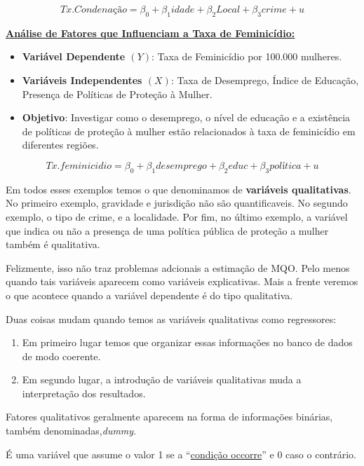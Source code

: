 \documentclass[
  letterpaper,
  DIV=11,
  numbers=noendperiod]{scrreprt}
\providecommand{\tightlist}{%
  \setlength{\itemsep}{0pt}\setlength{\parskip}{0pt}}
\begin{document}
\[Tx.Condenação = \beta_0 + \beta_1  idade  +  \beta_2 Local  + \beta_3  crime + u\]

\ul{\textbf{Análise de Fatores que Influenciam a Taxa de Feminicídio:}}

\begin{itemize}
\tightlist
\item
  \textbf{Variável Dependente \((Y)\)}: Taxa de Feminicídio por 100.000
  mulheres.
\item
  \textbf{Variáveis Independentes \((X)\)}: Taxa de Desemprego, Índice
  de Educação, Presença de Políticas de Proteção à Mulher.
\item
  \textbf{Objetivo}: Investigar como o desemprego, o nível de educação e
  a existência de políticas de proteção à mulher estão relacionados à
  taxa de feminicídio em diferentes regiões.
\end{itemize}

\[Tx.feminicidio = \beta_0 + \beta_1 desemprego + \beta_2 educ + \beta_3 política + u \]

Em todos esses exemplos temos o que denominamos de \textbf{variáveis
qualitativas}. No primeiro exemplo, gravidade e jurisdição não são
quantificaveis. No segundo exemplo, o tipo de crime, e a localidade. Por
fim, no último exemplo, a variável que indica ou não a presença de uma
política pública de proteção a mulher também é qualitativa.

Felizmente, isso não traz problemas adcionais a estimação de MQO. Pelo
menos quando tais variáveis aparecem como variáveis explicativas. Mais a
frente veremos o que acontece quando a variável dependente é do tipo
qualitativa.

Duas coisas mudam quando temos as variáveis qualitativas como
regressores:

\begin{enumerate}
\def\labelenumi{\arabic{enumi}.}
\tightlist
\item
  Em primeiro lugar temos que organizar essas informações no banco de
  dados de modo coerente.
\item
  Em segundo lugar, a introdução de variáveis qualitativas muda a
  interpretação dos resultados.
\end{enumerate}

Fatores qualitativos geralmente aparecem na forma de informações
binárias, também denominadas,\emph{dummy}.

\begin{tcolorbox}[enhanced jigsaw, titlerule=0mm, colback=white, coltitle=black, opacityback=0, breakable, colbacktitle=quarto-callout-note-color!10!white, toprule=.15mm, colframe=quarto-callout-note-color-frame, toptitle=1mm, bottomtitle=1mm, opacitybacktitle=0.6, left=2mm, arc=.35mm, rightrule=.15mm, bottomrule=.15mm, leftrule=.75mm, title=\textcolor{quarto-callout-note-color}{\faInfo}\hspace{0.5em}{Variável Binária ou Dummy:}]

É uma variável que assume o valor 1 se a ``\ul{condição occorre}'' e 0
caso o contrário.

\end{tcolorbox}
\end{document}

